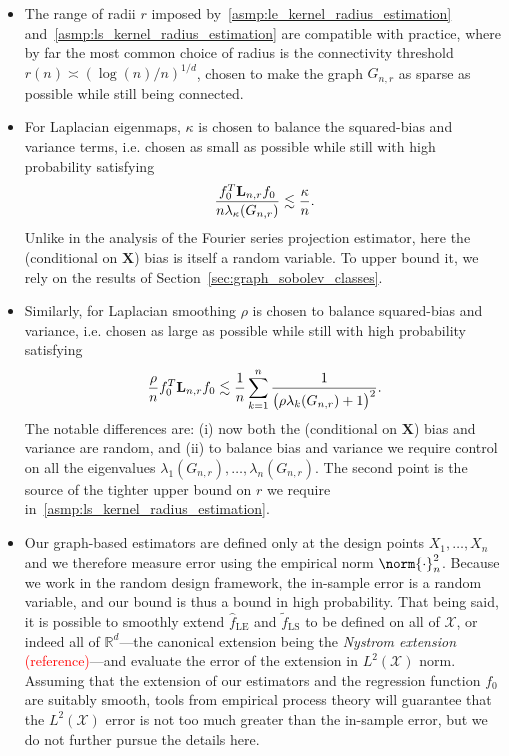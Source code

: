 \documentclass{article}
\newcommand{\Reals}{\mathbb{R}}
\newcommand{\1}{\mathbf{1}}
\newcommand{\Lap}{{\bf L}}
\newcommand{\Xset}{\mathcal{X}}
\newcommand{\Leb}{L}
\newcommand{\wt}[1]{\widetilde{#1}}
\newcommand{\wh}[1]{\widehat{#1}}
\newcommand{\LE}{\mathrm{LE}}
\newcommand{\LS}{\mathrm{LS}}
\theoremstyle{alden}
\theoremstyle{aldenthm}
\theoremstyle{definition}
\theoremstyle{remark}
\begin{document}
\begin{itemize}
	\item The range of radii $r$ imposed by~\ref{asmp:le_kernel_radius_estimation} and~\ref{asmp:ls_kernel_radius_estimation} are compatible with practice, where by far the most common choice of radius is the connectivity threshold $r(n) \asymp (\log(n)/n)^{1/d}$, chosen to make the graph $G_{n,r}$ as sparse as possible while still being connected. 
	\item For Laplacian eigenmaps, $\kappa$ is chosen to balance the squared-bias and variance terms, i.e. chosen as small as possible while still with high probability satisfying 
	\begin{equation*}
	\frac{f_0^T \Lap_{n,r} f_0}{n \lambda_{\kappa}(G_{n,r})} \lesssim \frac{\kappa}{n}.
	\end{equation*}
	Unlike in the analysis of the Fourier series projection estimator, here the (conditional on $\mathbf{X}$) bias is itself a random variable. To upper bound it, we rely on the results of Section~\ref{sec:graph_sobolev_classes}. 
	\item Similarly, for Laplacian smoothing $\rho$ is chosen to balance squared-bias and variance, i.e. chosen as large as possible while still with high probability satisfying
	\begin{equation*}
	\frac{\rho}{n} f_0^T \Lap_{{n,r}} f_0 \lesssim \frac{1}{n}\sum_{k = 1}^{n} \frac{1}{\bigl(\rho \lambda_{k}(G_{n,r}) + 1\bigr)^2}.
	\end{equation*}
	The notable differences are: (i) now both the (conditional on $\mathbf{X}$) bias and variance are random, and (ii) to balance bias and variance we require control on all the eigenvalues $\lambda_1(G_{n,r}),\ldots,\lambda_n(G_{n,r})$. The second point is the source of the tighter upper bound on $r$ we require in~\ref{asmp:ls_kernel_radius_estimation}.
	\item Our graph-based estimators are defined only at the design points $X_1,\ldots,X_n$ and we therefore measure error using the empirical norm $\norm{\cdot}_n^2$. Because we work in the random design framework, the in-sample error is a random variable, and our bound is thus a bound in high probability. That being said, it is possible to smoothly extend $\wh{f}_{\LE}$ and $\wt{f}_{\LS}$ to be defined on all of $\Xset$, or indeed all of $\Reals^d$---the canonical extension being the \emph{Nystrom extension} \textcolor{red}{(reference)}---and evaluate the error of the extension in $\Leb^2(\Xset)$ norm. Assuming that the extension of our estimators and the regression function $f_0$ are suitably smooth, tools from empirical process theory will guarantee that the $\Leb^2(\Xset)$ error is not too much greater than the in-sample error, but we do not further pursue the details here.

\end{itemize}
\end{document}
